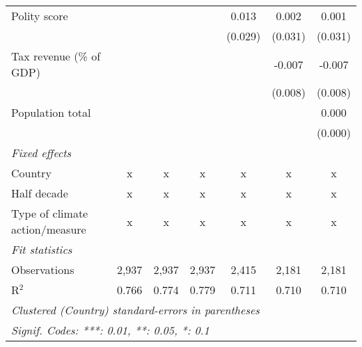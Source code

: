 \begin{tabular}{lcccccc}
   Polity score                                                                &         &               &                & 0.013          & 0.002         & 0.001\\   
                                                                               &         &               &                & (0.029)        & (0.031)       & (0.031)\\   
   Tax revenue (\% of GDP)                                                     &         &               &                &                & -0.007        & -0.007\\   
                                                                               &         &               &                &                & (0.008)       & (0.008)\\   
   Population total                                                            &         &               &                &                &               & 0.000\\   
                                                                               &         &               &                &                &               & (0.000)\\   
   \emph{Fixed effects}\\
   Country                                                                     & x       & x             & x              & x              & x             & x\\  
   Half decade                                                                 & x       & x             & x              & x              & x             & x\\  
   Type of climate action/measure                                              & x       & x             & x              & x              & x             & x\\  
   \midrule \emph{Fit statistics}\\
   Observations                                                                & 2,937   & 2,937         & 2,937          & 2,415          & 2,181         & 2,181\\  
   R$^2$                                                                       & 0.766   & 0.774         & 0.779          & 0.711          & 0.710         & 0.710\\  
   \midrule
   \multicolumn{7}{l}{\emph{Clustered (Country) standard-errors in parentheses}}\\
   \multicolumn{7}{l}{\emph{Signif. Codes: ***: 0.01, **: 0.05, *: 0.1}}\\
\end{tabular}
\par\endgroup


